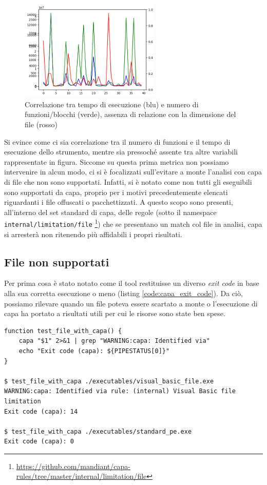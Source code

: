 \begin{figure}[!htb]
    \centering
    \includegraphics[width=0.6\textwidth]{assets/capa_correlation_plot.png}
    \caption{Correlazione tra tempo di esecuzione (blu) e numero di funzioni/blocchi (verde), assenza di relazione con la dimensione del file (rosso)}
    \label{fig:capa_correlation_plot}
\end{figure}

Si evince come ci sia correlazione tra il numero di funzioni e il tempo di esecuzione dello strumento, mentre sia pressoché assente tra altre variabili rappresentate in figura.
Siccome su questa prima metrica non possiamo intervenire in alcun modo, ci si è focalizzati sull'evitare a monte l'analisi con capa di file che non sono supportati.
Infatti, si è notato come non tutti gli eseguibili sono supportati da capa, proprio per i motivi precedentemente elencati riguardanti i file offuscati o pacchettizzati. A questo scopo sono presenti, all'interno del set standard di capa, delle regole
(sotto il namespace \texttt{internal/limitation/file} \footnote{\url{https://github.com/mandiant/capa-rules/tree/master/internal/limitation/file}})
che se presentano un match col file in analisi, capa si arresterà non ritenendo più affidabili i propri risultati.

\subsection{File non supportati}
\label{chap:static_analysis_obfuscated}
Per prima cosa è stato notato come il tool restituisse un diverso \emph{exit code} in base alla sua corretta esecuzione o meno (listing \ref{code:capa_exit_code}). Da ciò, possiamo rilevare quando un file poteva essere scartato a monte o l'esecuzione di capa ha portato a risultati utili per cui le risorse sono state ben spese.

\begin{code}
\begin{verbatim}
function test_file_with_capa() {
    capa "$1" 2>&1 | grep "WARNING:capa: Identified via"
    echo "Exit code (capa): ${PIPESTATUS[0]}"
}

$ test_file_with_capa ./executables/visual_basic_file.exe
WARNING:capa: Identified via rule: (internal) Visual Basic file limitation
Exit code (capa): 14

$ test_file_with_capa ./executables/standard_pe.exe
Exit code (capa): 0
\end{verbatim}
\caption{Distinzione tra gli exit code di capa}
\label{code:capa_exit_code}
\end{code}

